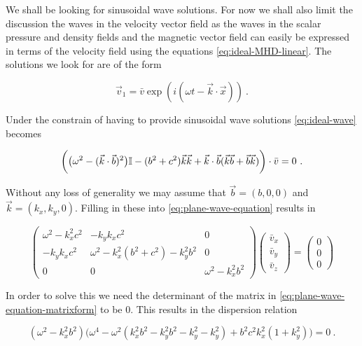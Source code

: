 We shall be looking for sinusoidal wave solutions. For now we shall also limit the discussion the waves in the velocity vector field as the waves in the scalar pressure and density fields and the magnetic vector field can easily be expressed in terms of the velocity field using the equations \autoref{eq:ideal-MHD-linear}. The solutions we look for are of the form

$$ \vec{v}_1 = \bar{v} \exp(i(\omega t - \vec{k} \cdot \vec{x})) \ .$$ 

Under the constrain of having to provide sinusoidal wave solutions \autoref{eq:ideal-wave} becomes

\begin{equation}
\label{eq:plane-wave-equation}
\bigg( \big( \omega^2 - (\vec{k}\cdot \vec{b})^2 \big) \mathbb{I} - (b^2 + c^2)\vec{k}\vec{k} + \vec{k} \cdot \vec{b}(\vec{k}\vec{b} + \vec{b}\vec{k}) \bigg) \cdot \bar{v} = 0 \ .
\end{equation} 

Without any loss of generality we may assume that $\vec{b} = (b,0,0)$ and $\vec{k} = (k_x, k_y, 0) $. Filling in these into \autoref{eq:plane-wave-equation} results in

\begin{equation}
\label{eq:plane-wave-equation-matrixform}
\begin{pmatrix}
 \omega^ 2-k_x^2 c^2  &  - k_y k_x c^2  & 0\\
- k_y k_x c^2  &  \omega^2  - k_x^2 (b^2 + c^2) - k_y^2 b^2  &  0\\
0  &  0  & \omega^2  -  k_x^2 b^2
\end{pmatrix}
\begin{pmatrix}
\bar{v}_x \\
\bar{v}_y \\
\bar{v}_z
\end{pmatrix}
 = 
\begin{pmatrix}
0 \\
0 \\
0
\end{pmatrix}
\end{equation} 

In order to solve this we need the determinant of the matrix in \autoref{eq:plane-wave-equation-matrixform} to be $0$. This results in the dispersion relation

\begin{equation}
\label{eq:dispersion}
(\omega^2 - k_x^2 b^2)\big( \omega^4 - \omega^2(k_x^2 b^2 - k_y^2 b^2 - k_y^2 - k_y^2) + b^2 c^2 k_x^2(1 + k_y^2) \big) = 0 \ .
\end{equation}


